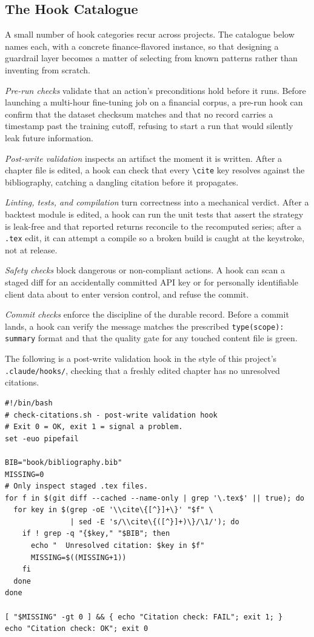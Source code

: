 \subsection{The Hook Catalogue}\label{subsec:hook-catalogue}

A small number of hook categories recur across projects. The catalogue below names each, with a concrete finance-flavored instance, so that designing a guardrail layer becomes a matter of selecting from known patterns rather than inventing from scratch.

\emph{Pre-run checks} validate that an action's preconditions hold before it runs. Before launching a multi-hour fine-tuning job on a financial corpus, a pre-run hook can confirm that the dataset checksum matches and that no record carries a timestamp past the training cutoff, refusing to start a run that would silently leak future information.

\emph{Post-write validation} inspects an artifact the moment it is written. After a chapter file is edited, a hook can check that every \texttt{\textbackslash cite} key resolves against the bibliography, catching a dangling citation before it propagates.

\emph{Linting, tests, and compilation} turn correctness into a mechanical verdict. After a backtest module is edited, a hook can run the unit tests that assert the strategy is leak-free and that reported returns reconcile to the recomputed series; after a \texttt{.tex} edit, it can attempt a compile so a broken build is caught at the keystroke, not at release.

\emph{Safety checks} block dangerous or non-compliant actions. A hook can scan a staged diff for an accidentally committed API key or for personally identifiable client data about to enter version control, and refuse the commit.

\emph{Commit checks} enforce the discipline of the durable record. Before a commit lands, a hook can verify the message matches the prescribed \texttt{type(scope): summary} format and that the quality gate for any touched content file is green.

The following is a post-write validation hook in the style of this project's \texttt{.claude/hooks/}, checking that a freshly edited chapter has no unresolved citations.

\begin{verbatim}
#!/bin/bash
# check-citations.sh - post-write validation hook
# Exit 0 = OK, exit 1 = signal a problem.
set -euo pipefail

BIB="book/bibliography.bib"
MISSING=0
# Only inspect staged .tex files.
for f in $(git diff --cached --name-only | grep '\.tex$' || true); do
  for key in $(grep -oE '\\cite\{[^}]+\}' "$f" \
               | sed -E 's/\\cite\{([^}]+)\}/\1/'); do
    if ! grep -q "{$key," "$BIB"; then
      echo "  Unresolved citation: $key in $f"
      MISSING=$((MISSING+1))
    fi
  done
done

[ "$MISSING" -gt 0 ] && { echo "Citation check: FAIL"; exit 1; }
echo "Citation check: OK"; exit 0
\end{verbatim}

